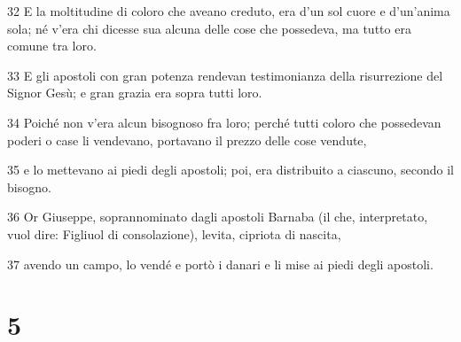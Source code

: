 \par 32 E la moltitudine di coloro che aveano creduto, era d'un sol cuore e d'un'anima sola; né v'era chi dicesse sua alcuna delle cose che possedeva, ma tutto era comune tra loro.
\par 33 E gli apostoli con gran potenza rendevan testimonianza della risurrezione del Signor Gesù; e gran grazia era sopra tutti loro.
\par 34 Poiché non v'era alcun bisognoso fra loro; perché tutti coloro che possedevan poderi o case li vendevano, portavano il prezzo delle cose vendute,
\par 35 e lo mettevano ai piedi degli apostoli; poi, era distribuito a ciascuno, secondo il bisogno.
\par 36 Or Giuseppe, soprannominato dagli apostoli Barnaba (il che, interpretato, vuol dire: Figliuol di consolazione), levita, cipriota di nascita,
\par 37 avendo un campo, lo vendé e portò i danari e li mise ai piedi degli apostoli.

\chapter{5}

